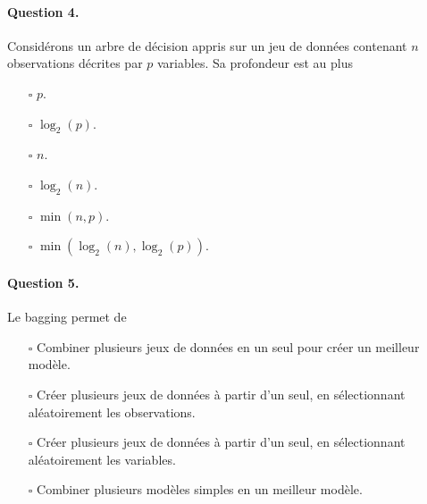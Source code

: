 \paragraph{Question 4.} Considérons un arbre de décision appris sur un jeu de
données contenant $n$ observations décrites par $p$ variables. Sa profondeur
est au plus
\begin{itemize}
\item[$\square$] $p$.
\item[$\square$] $\log_2(p)$.
\item[$\square$] $n$.
\item[$\square$] $\log_2(n)$.
\item[$\square$] $\min(n, p)$.
\item[$\square$] $\min(\log_2(n), \log_2(p))$.
\end{itemize}

\paragraph{Question 5.} Le bagging permet de
\begin{itemize}
\item[$\square$] Combiner plusieurs jeux de données en un seul pour créer un meilleur modèle.
\item[$\square$] Créer plusieurs jeux de données à partir d'un seul, en sélectionnant aléatoirement les observations.
\item[$\square$] Créer plusieurs jeux de données à partir d'un seul, en sélectionnant aléatoirement les variables.
\item[$\square$] Combiner plusieurs modèles simples en un meilleur modèle.
\end{itemize}


